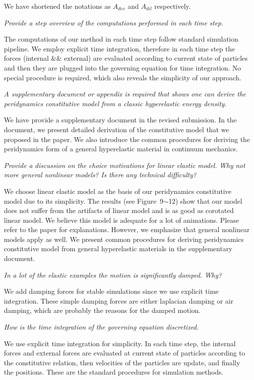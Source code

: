 We have shortened the notations as $A_{dev}$ and $A_{dil}$ respectively.

\emph{Provide a step overview of the computations performed in each time step.}

The computations of our method in each time step follow standard simulation pipeline. We employ explicit time integration, therefore in each time step the forces (internal \&\& external) are evaluated according to current state of particles and then they are plugged into the governing equation for time integration. No special procedure is required, which also reveals the simplicity of our approach.

\emph{A supplementary document or appendix is required that shows one can derive the peridynamics constitutive model from a classic hyperelastic energy density.}

We have provide a supplementary document in the revised submission. In the document, we present detailed derivation of the constitutive model that we proposed in the paper. We also introduce the common procedures for deriving the peridynamics form of a general hyperelastic material in continuum mechanics.

\emph{Provide a discussion on the choice motivations for linear elastic model. Why not more general nonlinear models? Is there any technical difficulty?}

We choose linear elastic model as the basis of our peridynamics constitutive model due to its simplicity. The results (see Figure~9$\sim$12) show that our model does not suffer from the artifacts of linear model and is as good as corotated linear model. We believe this model is adequate for a lot of animations. Please refer to the paper for explanations. However, we emphasize that general nonlinear models apply as well. We present common procedures for deriving peridynamics constitutive model from general hyperelastic materials in the supplementary document.

\emph{In a lot of the elastic examples the motion is significantly damped. Why?}

We add damping forces for stable simulations since we use explicit time integration. These simple damping forces are either laplacian damping or air damping, which are probably the reasons for the damped motion.

\emph{How is the time integration of the governing equation discretized.}

We use explicit time integration for simplicity. In each time step, the internal forces and external forces are evaluated at current state of particles according to the constitutive relation, then velocities of the particles are update, and finally the positions. These are the standard procedures for simulation methods.

